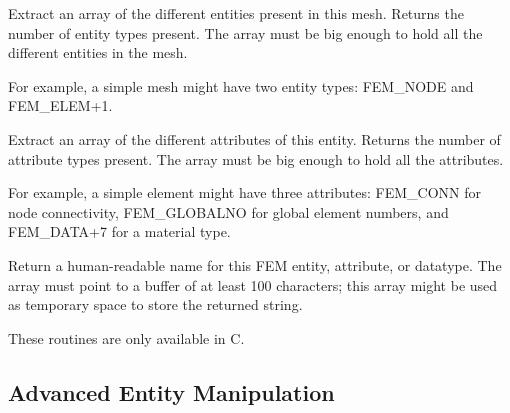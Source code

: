 Extract an array of the different entities present in this mesh.
Returns the number of entity types present.  The 
array must be big enough to hold all the different entities in
the mesh.

For example, a simple mesh might have two entity types:
FEM\_NODE and FEM\_ELEM+1.



Extract an array of the different attributes of this entity.
Returns the number of attribute types present.  The 
array must be big enough to hold all the attributes.

For example, a simple element might have three attributes:
FEM\_CONN for node connectivity, FEM\_GLOBALNO for global element
numbers, and FEM\_DATA+7 for a material type.


Return a human-readable name for this FEM entity, attribute, or datatype.
The  array must point to a buffer of at least 100 characters;
this array might be used as temporary space to store the returned string.

These routines are only available in C.


\subsection{Advanced Entity Manipulation}


